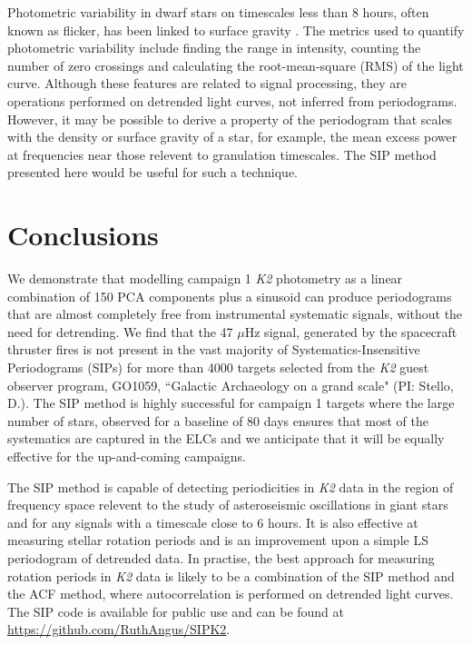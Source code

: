 Photometric variability in dwarf stars on timescales less than 8 hours, often
known as flicker, has been linked to surface gravity
\citep[][]{Bastien2013, Kipping2014}.
The metrics used to quantify photometric variability include finding the range
in intensity, counting the number of zero crossings and calculating the
root-mean-square (RMS) of the light curve.
Although these features are related to signal processing, they are operations
performed on detrended light curves, not inferred from periodograms.
However, it may be possible to derive a property of the periodogram that scales
with the density or surface gravity of a star, for example, the mean excess
power at frequencies near those relevent to granulation timescales.
The SIP method presented here would be useful for such a technique.

\section{Conclusions}
\label{sec:conclusions}
We demonstrate that modelling campaign 1 {\it K2} photometry as a linear
combination of 150 PCA components plus a sinusoid can produce periodograms
that are almost completely free from instrumental systematic signals, without
the need for detrending.
We find that the 47 $\mu$Hz signal, generated by the spacecraft thruster
fires is not present in the vast majority of Systematics-Insensitive
Periodograms (SIPs) for more than 4000 targets
selected from the {\it K2} guest observer program, GO1059, ``Galactic
Archaeology on a grand scale" (PI: Stello, D.).
The SIP method is highly successful for campaign 1 targets where the large
number of stars, observed for a baseline of 80 days ensures that most of the
systematics are captured in the ELCs and we anticipate that it will
be equally effective for the up-and-coming campaigns.

The SIP method is capable of detecting periodicities in {\it K2} data in the
region of frequency space relevent to the study of asteroseismic oscillations
in giant stars and for any signals with a timescale close to 6 hours.
It is also effective at measuring stellar rotation periods and is an
improvement upon a simple LS periodogram of detrended data.
In practise, the best approach for measuring rotation periods in {\it K2} data
is likely to be a combination of the SIP method and the ACF method, where
autocorrelation is performed on detrended light curves.
The SIP code is available for public use and can be found at
\url{https://github.com/RuthAngus/SIPK2}.

